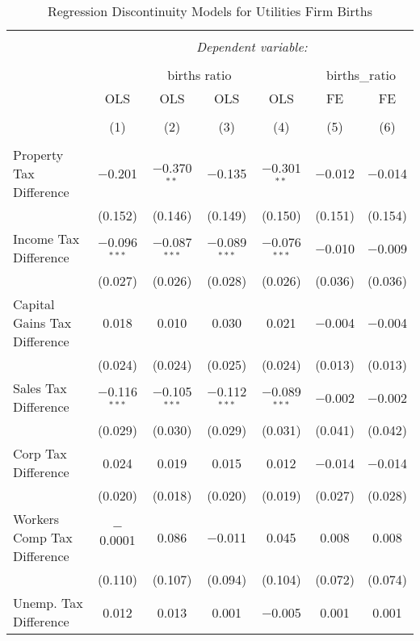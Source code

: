 
\begin{table}[!htbp] \centering 
  \caption{Regression Discontinuity Models for  Utilities Firm Births} 
  \label{22rd} 
\begin{tabular}{@{\extracolsep{5pt}}lcccccc} 
\\[-1.8ex]\hline 
\hline \\[-1.8ex] 
 & \multicolumn{6}{c}{\textit{Dependent variable:}} \\ 
\cline{2-7} 
\\[-1.8ex] & \multicolumn{4}{c}{births ratio} & \multicolumn{2}{c}{births\_ratio} \\ 
 & OLS & OLS & OLS & OLS & FE & FE \\ 
\\[-1.8ex] & (1) & (2) & (3) & (4) & (5) & (6)\\ 
\hline \\[-1.8ex] 
 Property Tax Difference & $-$0.201 & $-$0.370$^{**}$ & $-$0.135 & $-$0.301$^{**}$ & $-$0.012 & $-$0.014 \\ 
  & (0.152) & (0.146) & (0.149) & (0.150) & (0.151) & (0.154) \\ 
  Income Tax Difference & $-$0.096$^{***}$ & $-$0.087$^{***}$ & $-$0.089$^{***}$ & $-$0.076$^{***}$ & $-$0.010 & $-$0.009 \\ 
  & (0.027) & (0.026) & (0.028) & (0.026) & (0.036) & (0.036) \\ 
  Capital Gains Tax Difference & 0.018 & 0.010 & 0.030 & 0.021 & $-$0.004 & $-$0.004 \\ 
  & (0.024) & (0.024) & (0.025) & (0.024) & (0.013) & (0.013) \\ 
  Sales Tax Difference & $-$0.116$^{***}$ & $-$0.105$^{***}$ & $-$0.112$^{***}$ & $-$0.089$^{***}$ & $-$0.002 & $-$0.002 \\ 
  & (0.029) & (0.030) & (0.029) & (0.031) & (0.041) & (0.042) \\ 
  Corp Tax Difference & 0.024 & 0.019 & 0.015 & 0.012 & $-$0.014 & $-$0.014 \\ 
  & (0.020) & (0.018) & (0.020) & (0.019) & (0.027) & (0.028) \\ 
  Workers Comp Tax Difference & $-$0.0001 & 0.086 & $-$0.011 & 0.045 & 0.008 & 0.008 \\ 
  & (0.110) & (0.107) & (0.094) & (0.104) & (0.072) & (0.074) \\ 
  Unemp. Tax Difference & 0.012 & 0.013 & 0.001 & $-$0.005 & 0.001 & 0.001 \\ 

\end{tabular}
\end{table}
